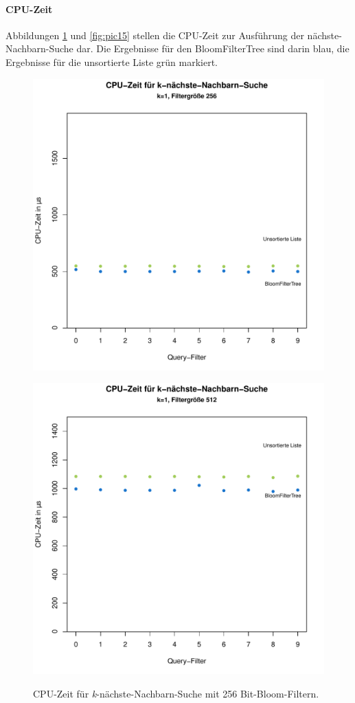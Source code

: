 \paragraph*{CPU-Zeit}
Abbildungen \ref{fig:pic14} und \ref{fig:pic15} stellen die CPU-Zeit zur Ausführung der nächste-Nachbarn-Suche dar. Die Ergebnisse für den BloomFilterTree sind darin blau, die Ergebnisse für die unsortierte Liste grün markiert.  
\begin{figure}[hptb]
	\centering
	\includegraphics[scale=0.7]{pictures/cputime_nn_256.pdf}\\
	\caption[CPU-Zeit für nächste-Nachbarn-Suche mit 256 Bit-Bloom-Filtern]{CPU-Zeit für \textit{k}-nächste-Nachbarn-Suche mit 256 Bit-Bloom-Filtern.}\label{fig:pic14}
	\includegraphics[scale=0.7]{pictures/cputime_nn_512.pdf}\\

\end{figure}
